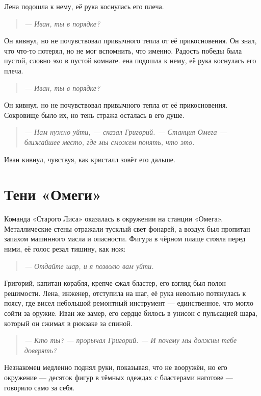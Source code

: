 \documentclass[12pt,a4paper]{book}
\newenvironment{dialogue}{\begin{quote}\itshape}{\end{quote}} %
\begin{document}
Лена подошла к нему, её рука коснулась его плеча.

\begin{dialogue}
--- Иван, ты в порядке?
\end{dialogue}

Он кивнул, но не почувствовал привычного тепла от её прикосновения. Он знал, что что-то потерял, но не мог вспомнить, что именно. Радость победы была пустой, словно эхо в пустой комнате.
ена подошла к нему, её рука коснулась его плеча.

\begin{dialogue}
--- Иван, ты в порядке?
\end{dialogue}

Он кивнул, но не почувствовал привычного тепла от её прикосновения. Сокровище было их, но тень стража осталась в его душе.

\begin{dialogue}
--- Нам нужно уйти, --- сказал Григорий. --- Станция Омега --- ближайшее место, где мы сможем понять, что это.
\end{dialogue}

Иван кивнул, чувствуя, как кристалл зовёт его дальше.

\chapter{Тени «Омеги»}

Команда «Старого Лиса» оказалась в окружении на станции «Омега». Металлические стены отражали тусклый свет фонарей, а воздух был пропитан запахом машинного масла и опасности. Фигура в чёрном плаще стояла перед ними, её голос резал тишину, как нож:

\begin{dialogue}
--- Отдайте шар, и я позволю вам уйти.
\end{dialogue}

Григорий, капитан корабля, крепче сжал бластер, его взгляд был полон решимости. Лена, инженер, отступила на шаг, её рука невольно потянулась к поясу, где висел небольшой ремонтный инструмент --- единственное, что могло сойти за оружие. Иван же замер, его сердце билось в унисон с пульсацией шара, который он сжимал в рюкзаке за спиной.

\begin{dialogue}
--- Кто ты? --- прорычал Григорий. --- И почему мы должны тебе доверять?
\end{dialogue}

Незнакомец медленно поднял руки, показывая, что не вооружён, но его окружение --- десяток фигур в тёмных одеждах с бластерами наготове --- говорило само за себя.
\end{document}
